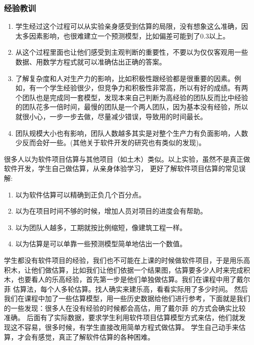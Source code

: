 \hypertarget{ux7ecfux9a8cux6559ux8bad}{%
\subsubsection{经验教训}\label{ux7ecfux9a8cux6559ux8bad}}

\begin{enumerate}
\tightlist
\item
  学生经过这个过程可以从实验亲身感受到估算的局限，没有想象这么准确，因太多因素影响，也很难建立一个预测模型，比如偏差可能到了0.3以上。
\item
  从这个过程里面也让他们感受到主观判断的重要性，不要以为仅仅客观用一些数据、用数学方程式就可以准确估出正确的答案。
\item
  了解复杂度和人对生产力的影响，比如积极性跟经验都是很重要的因素。例如，有一个学生经验很少，但竞争力和积极性非常高，所以有好的成绩。有两个团队也是完成同一套模型，发现本来自己判断为高经验的团队反而比中经验的团队花多一倍时间，最慢的团队是一个两人团队，因为基本没有经验，所以就很小心，一步一步去做，尽量减少错误，导致用的时间最长。
\item
  团队规模大小也有影响，团队人数越多其实是对整个生产力有负面影响，人数少反而会好一些。(其他关于软件开发的研究也有类似的发现)。
\end{enumerate}

很多人以为软件项目估算与其他项目（如土木）类似。以上实验，虽然不是真正做软件开发，学生自己做估算，从亲身体验学习，
更好了解软件项目估算的常见误解:

\begin{enumerate}
\tightlist
\item
  以为软件估算可以精确到正负几个百分点。
\item
  以为在项目时间不够的时候，增加人员对项目的进度会有帮助。
\item
  以为团队人越多，工期就按比例缩短，像建筑工程一样。
\item
  以为估算是可以单靠一些预测模型简单地估出一个数值。
\end{enumerate}

学生都没有软件项目的经验，我们也不可能在上课的时候做软件项目，于是用乐高积木，让他们做估算，比如我们让他们依据一个结果图，估算要多少人时来完成积木，也要看人的乐高经验，首先第一步是他们单独做估算。我们在课程中用了戴尔菲
估算法，每个人多轮估算。找人确实来建乐高，看看实际用了多少时间。
然后我们在课程中加了一些估算模型，用一些历史数据给他们进行参考，下面就是我们的一些发现：很多人在没有经验的时候都会高估，用了戴尔菲
的方式会确实比较准确。
后面有了实际数据，要求学生利用软件项目估算模型方式来估，他们就发现这不容易，很多时候，有学生直接改用简单方程式做估算。
学生自己动手来估算，才会有感觉，真正了解软件估算的各种困难。

